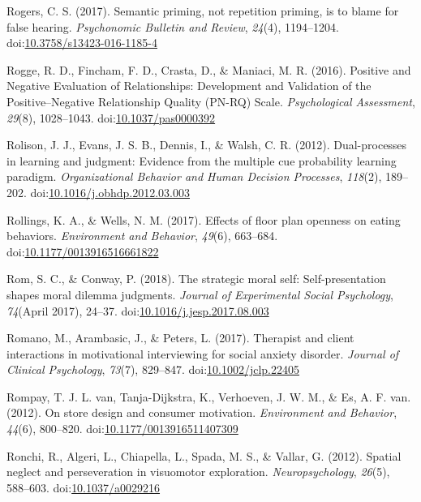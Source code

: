\documentclass[english,man]{apa6}
\begin{document}
\hypertarget{ref-Rogers2016}{}
Rogers, C. S. (2017). Semantic priming, not repetition priming, is to
blame for false hearing. \emph{Psychonomic Bulletin and Review},
\emph{24}(4), 1194--1204.
doi:\href{https://doi.org/10.3758/s13423-016-1185-4}{10.3758/s13423-016-1185-4}

\hypertarget{ref-Rogge2017}{}
Rogge, R. D., Fincham, F. D., Crasta, D., \& Maniaci, M. R. (2016).
Positive and Negative Evaluation of Relationships: Development and
Validation of the Positive--Negative Relationship Quality (PN-RQ) Scale.
\emph{Psychological Assessment}, \emph{29}(8), 1028--1043.
doi:\href{https://doi.org/10.1037/pas0000392}{10.1037/pas0000392}

\hypertarget{ref-Rolison2012}{}
Rolison, J. J., Evans, J. S. B., Dennis, I., \& Walsh, C. R. (2012).
Dual-processes in learning and judgment: Evidence from the multiple cue
probability learning paradigm. \emph{Organizational Behavior and Human
Decision Processes}, \emph{118}(2), 189--202.
doi:\href{https://doi.org/10.1016/j.obhdp.2012.03.003}{10.1016/j.obhdp.2012.03.003}

\hypertarget{ref-Rollings2017}{}
Rollings, K. A., \& Wells, N. M. (2017). Effects of floor plan openness
on eating behaviors. \emph{Environment and Behavior}, \emph{49}(6),
663--684.
doi:\href{https://doi.org/10.1177/0013916516661822}{10.1177/0013916516661822}

\hypertarget{ref-Rom2018}{}
Rom, S. C., \& Conway, P. (2018). The strategic moral self:
Self-presentation shapes moral dilemma judgments. \emph{Journal of
Experimental Social Psychology}, \emph{74}(April 2017), 24--37.
doi:\href{https://doi.org/10.1016/j.jesp.2017.08.003}{10.1016/j.jesp.2017.08.003}

\hypertarget{ref-Romano2017}{}
Romano, M., Arambasic, J., \& Peters, L. (2017). Therapist and client
interactions in motivational interviewing for social anxiety disorder.
\emph{Journal of Clinical Psychology}, \emph{73}(7), 829--847.
doi:\href{https://doi.org/10.1002/jclp.22405}{10.1002/jclp.22405}

\hypertarget{ref-VanRompay2012}{}
Rompay, T. J. L. van, Tanja-Dijkstra, K., Verhoeven, J. W. M., \& Es, A.
F. van. (2012). On store design and consumer motivation.
\emph{Environment and Behavior}, \emph{44}(6), 800--820.
doi:\href{https://doi.org/10.1177/0013916511407309}{10.1177/0013916511407309}

\hypertarget{ref-Ronchi2012}{}
Ronchi, R., Algeri, L., Chiapella, L., Spada, M. S., \& Vallar, G.
(2012). Spatial neglect and perseveration in visuomotor exploration.
\emph{Neuropsychology}, \emph{26}(5), 588--603.
doi:\href{https://doi.org/10.1037/a0029216}{10.1037/a0029216}
\end{document}
